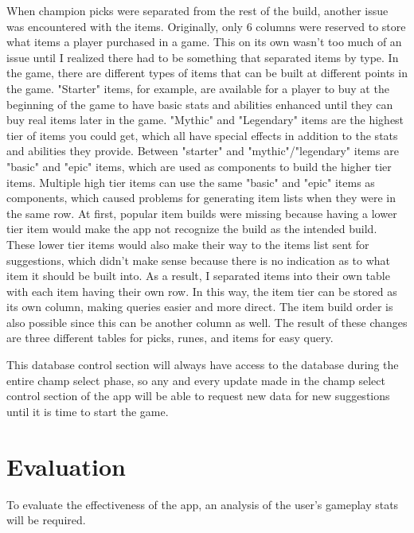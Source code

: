 \documentclass[10pt,twocolumn]{article}
\begin{document}
When champion picks were separated from the rest of the build, another issue was encountered with the items.
Originally, only 6 columns were reserved to store what items a player purchased in a game.
This on its own wasn't too much of an issue until I realized there had to be something that separated items by type.
In the game, there are different types of items that can be built at different points in the game.
"Starter" items, for example, are available for a player to buy at the beginning of the game to have basic stats and abilities enhanced until they can buy real items later in the game.
"Mythic" and "Legendary" items are the highest tier of items you could get, which all have special effects in addition to the stats and abilities they provide. 
Between "starter" and "mythic"/"legendary" items are "basic" and "epic" items, which are used as components to build the higher tier items. 
Multiple high tier items can use the same "basic" and "epic" items as components, which caused problems for generating item lists when they were in the same row.
At first, popular item builds were missing because having a lower tier item would make the app not recognize the build as the intended build.
These lower tier items would also make their way to the items list sent for suggestions, which didn't make sense because there is no indication as to what item it should be built into.
As a result, I separated items into their own table with each item having their own row.
In this way, the item tier can be stored as its own column, making queries easier and more direct.
The item build order is also possible since this can be another column as well.
The result of these changes are three different tables for picks, runes, and items for easy query. 

This database control section will always have access to the database during the entire champ select phase, so any and every update made in the champ select control section of the app will be able to request new data for new suggestions until it is time to start the game.

\section{Evaluation}
To evaluate the effectiveness of the app, an analysis of the user's gameplay stats will be required.
\end{document}
